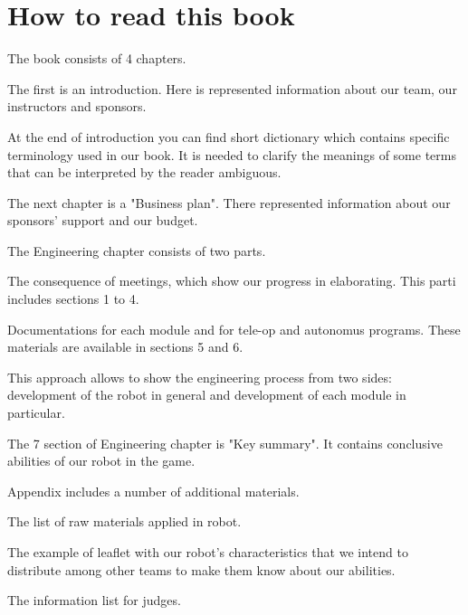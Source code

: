 \section{How to read this book}

The book consists of 4 chapters. \newline
\begin{enumerate*}
    \item The first is an introduction. Here is represented information about our team, our instructors and sponsors. 
    
    At the end of introduction you can find short dictionary which contains specific terminology used in our book. It is needed to clarify the meanings of some terms that can be interpreted by the reader ambiguous.
    
    \item The next chapter is a "Business plan". There represented information about our sponsors' support and our budget.\newline
    
    \item The Engineering chapter consists of two parts. 
    \begin{itemize*}
    	\item The consequence of meetings, which show our progress in elaborating. This parti includes sections 1 to 4.
    	
    	\item Documentations for each module and for tele-op and autonomus programs. These materials are available in sections 5 and 6.
    	
    \end{itemize*}
    
    This approach allows to show the engineering process from two sides: development of the robot in general and development of each module in particular.
    
    The 7 section of Engineering chapter is "Key summary". It contains conclusive abilities of our robot in the game.
    
    \item Appendix includes a number of additional materials.
    \begin{itemize*}
    	\item The list of raw materials applied in robot.
    	
    	\item The example of leaflet with our robot's characteristics that we intend to distribute among other teams to make them know about our abilities.
    	
    	\item The information list for judges.
    	
    \end{itemize*}
    
\end{enumerate*}

	
\fillpage	
